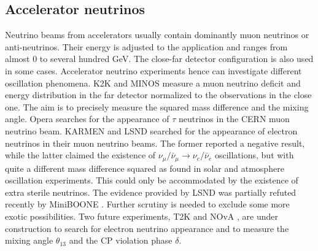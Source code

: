 \subsection{Accelerator  neutrinos}
\label{sec:acce}
Neutrino beams from accelerators usually contain dominantly muon
neutrinos or anti-neutrinos. Their energy is adjusted to the
application and ranges from almost 0 to several hundred GeV. The
close-far detector configuration is also used in some cases.
Accelerator neutrino experiments hence can investigate different
oscillation phenomena. K2K \cite{K2K06} and MINOS \cite{Min06} measure
a muon neutrino deficit and energy distribution in the far detector
normalized to the observations in the close one. The aim is to
precisely measure the squared mass difference and the mixing
angle. Opera \cite{Ope06} searches for the appearance of $\tau$
neutrinos in the CERN muon neutrino beam. KARMEN \cite{Kar03} and LSND
\cite{Dod06} searched for the appearance of electron neutrinos in
their muon neutrino beams. The former reported a negative result,
while the latter claimed the existence of $\nu_{\mu}/\bar{\nu}_{\mu}
\rightarrow \nu_{e}/\bar{\nu}_{e}$ oscillations, but with quite a
different mass difference squared as found in solar and atmosphere
oscillation experiments. This could only be accommodated by the
existence of extra sterile neutrinos. The evidence provided by LSND
was partially refuted recently by MiniBOONE \cite{Agu07}. Further
scrutiny is needed to exclude some more exotic possibilities. Two
future experiments, T2K \cite{T2K05} and NOvA \cite{Nov05}, are under
construction to search for electron neutrino appearance and to measure
the mixing angle $\theta_{13}$ and the CP violation phase $\delta$.

